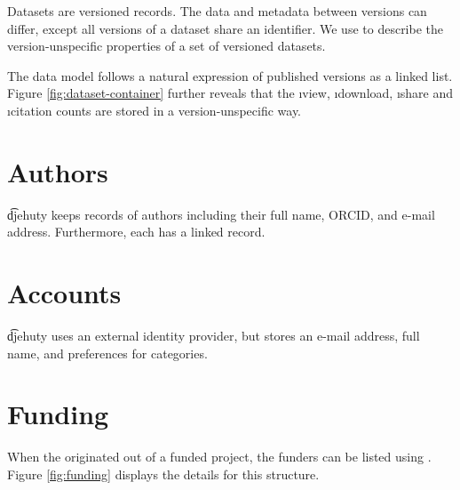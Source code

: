 
  Datasets are versioned records.  The data and metadata between versions
  can differ, except all versions of a dataset share an identifier.  We use
   to describe the version-unspecific properties
  of a set of versioned datasets.


  The data model follows a natural expression of published versions as a
  linked list.  Figure \ref{fig:dataset-container} further reveals that
  the \i{view}, \i{download}, \i{share} and \i{citation} counts are stored
  in a version-unspecific way.

\section{Authors}

  \t{djehuty} keeps records of authors including their full name, ORCID,
  and e-mail address.  Furthermore, each  has a linked
   record.


\section{Accounts}

  \t{djehuty} uses an external identity provider, but stores an e-mail address,
  full name, and preferences for categories.


\section{Funding}

  When the  originated out of a funded project, the funders
  can be listed using .  Figure \ref{fig:funding} displays
  the details for this structure.


